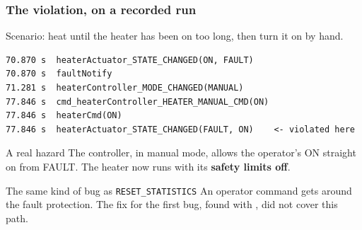 \begin{frame}[fragile]
  \frametitle{The violation, on a recorded run} \small
{}

Scenario: heat until the heater has been on too long, then turn it on by hand.

\begin{lstlisting}[style=shell]
70.870 s  heaterActuator_STATE_CHANGED(ON, FAULT)
70.870 s  faultNotify
71.281 s  heaterController_MODE_CHANGED(MANUAL)
77.846 s  cmd_heaterController_HEATER_MANUAL_CMD(ON)
77.846 s  heaterCmd(ON)
77.846 s  heaterActuator_STATE_CHANGED(FAULT, ON)    <- violated here
\end{lstlisting}

\pause

\begin{block}{A real hazard}\small
The controller, in manual mode, allows the operator's ON straight on from FAULT.
The heater now runs with its {\bf safety limits off}.
\end{block}

\pause

\begin{block}{The same kind of bug as {\tt RESET\_STATISTICS}}\small
An operator command gets around the fault protection. The fix for the first bug,
found with \lean{}, did not cover this path.
\end{block}

\end{frame}

